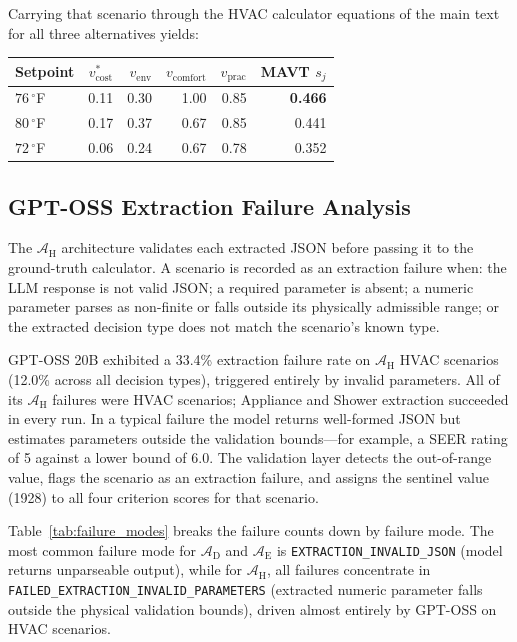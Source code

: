 \documentclass[11pt]{article}
\begin{document}
Carrying that scenario through the HVAC calculator equations of the main
text for all three alternatives yields:
\begin{center}
\begin{tabular}{@{}lrrrrr@{}}
\toprule
\textbf{Setpoint} & \textbf{$v_{\text{cost}}^{*}$} & \textbf{$v_{\text{env}}$}
  & \textbf{$v_{\text{comfort}}$} & \textbf{$v_{\text{prac}}$}
  & \textbf{MAVT $s_j$} \\
\midrule
$76\,^\circ$F & 0.11 & 0.30 & 1.00 & 0.85 & \textbf{0.466} \\
$80\,^\circ$F & 0.17 & 0.37 & 0.67 & 0.85 & 0.441 \\
$72\,^\circ$F & 0.06 & 0.24 & 0.67 & 0.78 & 0.352 \\
\bottomrule
\end{tabular}
\end{center}
\subsection{GPT-OSS Extraction Failure Analysis}
\label{app:extraction_failure_analysis}
The $\mathcal{A}_{\text{H}}$ architecture validates each extracted JSON
before passing it to the ground-truth calculator. A scenario is recorded
as an extraction failure when: the LLM response is not valid JSON; a
required parameter is absent; a numeric parameter parses as non-finite or
falls outside its physically admissible range; or the extracted decision
type does not match the scenario's known type.

GPT-OSS 20B exhibited a 33.4\% extraction failure rate on
$\mathcal{A}_{\text{H}}$ HVAC scenarios (12.0\% across all decision types),
triggered entirely by invalid parameters. All of its $\mathcal{A}_{\text{H}}$
failures were HVAC scenarios; Appliance and Shower extraction succeeded in
every run. In a typical failure the model returns well-formed JSON but
estimates parameters outside the validation bounds---for example, a SEER rating of 5 against a
lower bound of 6.0. The validation layer detects the out-of-range value,
flags the scenario as an extraction failure, and assigns the sentinel
value (1928) to all four criterion scores for that scenario.

Table~\ref{tab:failure_modes} breaks the failure counts down by failure mode. The most common failure mode for $\mathcal{A}_{\text{D}}$ and $\mathcal{A}_{\text{E}}$ is \texttt{EXTRACTION\_INVALID\_\allowbreak JSON} (model returns unparseable output), while for $\mathcal{A}_{\text{H}}$, all failures concentrate in \texttt{FAILED\_EXTRACTION\_\allowbreak INVALID\_\allowbreak PARAMETERS} (extracted numeric parameter falls outside the physical validation bounds), driven almost entirely by GPT-OSS on HVAC scenarios.
\end{document}
